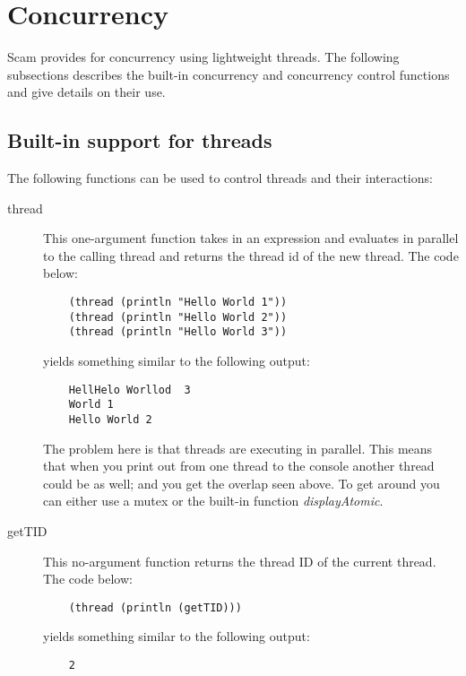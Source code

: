 \chapter{Concurrency}
\label{Concurrency}

Scam provides for concurrency using lightweight threads.
The following subsections describes the 
built-in concurrency and concurrency control functions and give details on 
their use.

\section{Built-in support for threads}

The following functions can be used to control threads and their
interactions:

\begin{description}
\item[thread]
This one-argument function takes in an expression and evaluates in
parallel to the calling thread and returns the thread id of the new
thread.  The code below:

\begin{verbatim}
    (thread (println "Hello World 1"))
    (thread (println "Hello World 2"))
    (thread (println "Hello World 3"))
\end{verbatim} 

yields something similar to the following output:

\begin{verbatim}
    HellHelo Worllod  3
    World 1
    Hello World 2
\end{verbatim} 

The problem here is that threads are executing in parallel.  This means
that when you print out from one thread to the console another thread
could be as well; and you get the overlap seen above.  To get around
you can either use a mutex or the built-in function {\it displayAtomic}.

\item[getTID]
This no-argument function returns the thread ID of the current thread.
The code below:

\begin{verbatim}
    (thread (println (getTID)))
\end{verbatim}

yields something similar to the following output:

\begin{verbatim}
    2
\end{verbatim}


\end{description}
